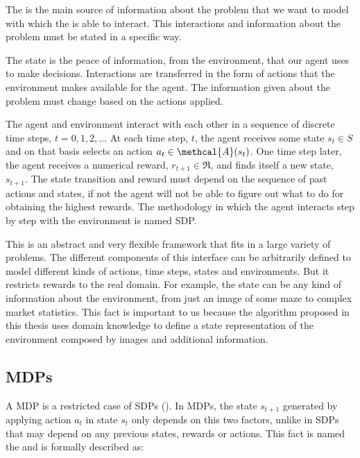 The  is the main source of information about the problem that we want to model with which the  is able to interact. This interactions and information about the problem must be stated in a specific way.

The state is the peace of information, from the environment, that our agent uses to make decisions. Interactions are transferred in the form of actions that the environment makes available for the agent. The information given about the problem must change based on the actions applied.

The agent and environment interact with each other in a sequence of discrete time steps, $t=0,1,2,\dots$ At each time step, $t$, the agent receives some state $s_t \in S$ and on that basis selects an action $a_t \in \methcal{A}( s_t )$. One time step later, the agent receives a numerical reward, $r_{t+1} \in \Re$, and finds itself a new state, $s_{t+1}$. The state transition and reward must depend on the sequence of past actions and states, if not the agent will not be able to figure out what to do for obtaining the highest rewards. The methodology in which the agent interacts step by step with the environment is named \acf{SDP}.


This is an abstract and very flexible framework that fits in a large variety of problems. The different components of this interface can be arbitrarily defined to model different kinds of actions, time steps, states and environments. But it restricts rewards to the real domain. For example, the state can be any kind of information about the environment, from just an image of some maze to complex market statistics. This fact is important to us because the algorithm proposed in this thesis uses domain knowledge to define a state representation of the environment composed by images and additional information.

\subsection{\aclp{MDP}\label{subsec:MDP}}

A \acf{MDP} is a restricted case of \acp{SDP} (\cite[Section~3.5]{sutton1998introduction}). In \acp{MDP}, the state $s_{t+1}$ generated by applying action $a_t$ in state $s_t$ only depends on this two factors, unlike in \acp{SDP} that may depend on any previous states, rewards or actions. This fact is named the  and is formally described as:

